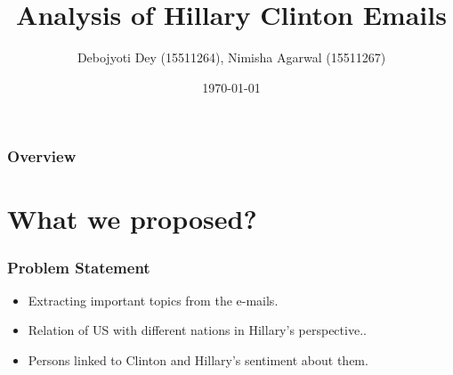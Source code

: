 \documentclass{beamer}
\title[Short title]{Analysis of Hillary Clinton Emails} %
\author{Debojyoti Dey (15511264), Nimisha Agarwal (15511267)} %
\date{\today} %
\begin{document}
	
\begin{frame}
	\titlepage %
\end{frame}

\begin{frame}
	\frametitle{Overview} %
	\tableofcontents %
\end{frame}


\section{What we proposed?}


\begin{frame}
	\frametitle{Problem Statement}
	\begin{itemize}
		\item Extracting important topics from the e-mails.
		\item Relation of US with different nations in Hillary's perspective..
		\item Persons linked to Clinton and Hillary's sentiment about them.
	\end{itemize}
\end{frame}

\end{document}
